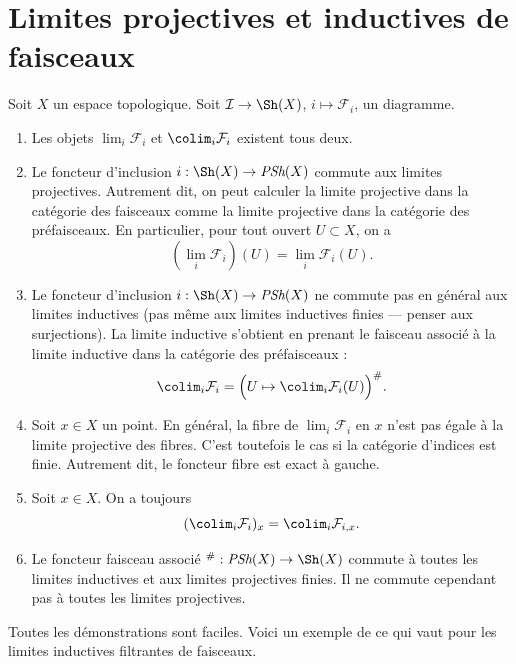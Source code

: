 \section{Limites projectives et inductives de faisceaux}
\label{section-limits-sheaves}

\noindent
Soit $X$ un espace topologique.
Soit $\mathcal{I} \to \Sh(X)$, $i \mapsto \mathcal{F}_i$,
un diagramme.
\begin{enumerate}
\item Les objets $\lim_i \mathcal{F}_i$ et $\colim_i \mathcal{F}_i$
existent tous deux.
\item Le foncteur d'inclusion $i : \Sh(X) \to \textit{PSh}(X)$
commute aux limites projectives. Autrement dit, on peut calculer la limite projective
dans la catégorie des faisceaux comme la limite projective dans la catégorie des
préfaisceaux. En particulier, pour tout ouvert $U \subset X$, on a
$$
(\lim_i \mathcal{F}_i)(U) = \lim_i \mathcal{F}_i(U).
$$
\item Le foncteur d'inclusion $i : \Sh(X) \to \textit{PSh}(X)$
ne commute pas en général aux limites inductives (pas même
aux limites inductives finies --- penser aux surjections). La limite inductive
s'obtient en prenant le faisceau associé à la limite inductive dans la
catégorie des préfaisceaux :
$$
\colim_i \mathcal{F}_i =
\Big(U \mapsto \colim_i \mathcal{F}_i(U)\Big)^\#.
$$
\item Soit $x \in X$ un point. En général, la fibre de
$\lim_i \mathcal{F}_i$ en $x$ n'est pas égale à
la limite projective des fibres. C'est toutefois le cas si la catégorie d'indices est finie.
Autrement dit, le foncteur fibre est
exact à gauche.
\item Soit $x \in X$. On a toujours
$$
(\colim_i \mathcal{F}_i)_x = \colim_i \mathcal{F}_{i, x}.
$$
\item Le foncteur faisceau associé
${}^\# : \textit{PSh}(X) \to \Sh(X)$ commute à toutes les
limites inductives et aux limites projectives finies. Il ne commute cependant pas
à toutes les limites projectives.
\end{enumerate}
Toutes les démonstrations sont faciles. Voici un exemple de ce qui vaut pour les limites
inductives filtrantes de faisceaux.


